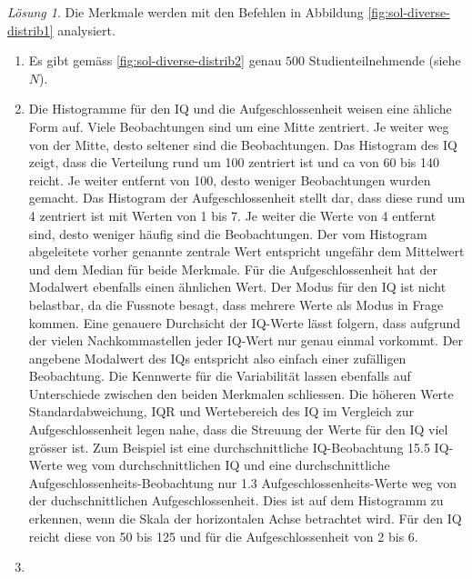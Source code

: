 \documentclass[
]{book}
\providecommand{\tightlist}{%
  \setlength{\itemsep}{0pt}\setlength{\parskip}{0pt}}
\theoremstyle{definition}
\theoremstyle{definition}
\theoremstyle{definition}
\theoremstyle{definition}
\theoremstyle{remark}
\newtheorem*{solution}{Lösung}
\begin{document}
\begin{solution}
Die Merkmale werden mit den Befehlen in Abbildung \ref{fig:sol-diverse-distrib1} analysiert.

\begin{enumerate}
\def\labelenumi{\alph{enumi}.}
\tightlist
\item
  Es gibt gemäss \ref{fig:sol-diverse-distrib2} genau \(500\) Studienteilnehmende (siehe \(N\)).
\item
  Die Histogramme für den IQ und die Aufgeschlossenheit weisen eine ähliche Form auf. Viele Beobachtungen sind um eine Mitte zentriert. Je weiter weg von der Mitte, desto seltener sind die Beobachtungen. Das Histogram des IQ zeigt, dass die Verteilung rund um 100 zentriert ist und ca von 60 bis 140 reicht. Je weiter entfernt von 100, desto weniger Beobachtungen wurden gemacht. Das Histogram der Aufgeschlossenheit stellt dar, dass diese rund um 4 zentriert ist mit Werten von 1 bis 7. Je weiter die Werte von 4 entfernt sind, desto weniger häufig sind die Beobachtungen. Der vom Histogram abgeleitete vorher genannte zentrale Wert entspricht ungefähr dem Mittelwert und dem Median für beide Merkmale. Für die Aufgeschlossenheit hat der Modalwert ebenfalls einen ähnlichen Wert. Der Modus für den IQ ist nicht belastbar, da die Fussnote besagt, dass mehrere Werte als Modus in Frage kommen. Eine genauere Durchsicht der IQ-Werte lässt folgern, dass aufgrund der vielen Nachkommastellen jeder IQ-Wert nur genau einmal vorkommt. Der angebene Modalwert des IQs entspricht also einfach einer zufälligen Beobachtung. Die Kennwerte für die Variabilität lassen ebenfalls auf Unterschiede zwischen den beiden Merkmalen schliessen. Die höheren Werte Standardabweichung, IQR und Wertebereich des IQ im Vergleich zur Aufgeschlossenheit legen nahe, dass die Streuung der Werte für den IQ viel grösser ist. Zum Beispiel ist eine durchschnittliche IQ-Beobachtung 15.5 IQ-Werte weg vom durchschnittlichen IQ und eine durchschnittliche Aufgeschlossenheits-Beobachtung nur 1.3 Aufgeschlossenheits-Werte weg von der duchschnittlichen Aufgeschlossenheit. Dies ist auf dem Histogramm zu erkennen, wenn die Skala der horizontalen Achse betrachtet wird. Für den IQ reicht diese von 50 bis 125 und für die Aufgeschlossenheit von 2 bis 6.
\item

\end{enumerate}
\end{solution}
\end{document}
